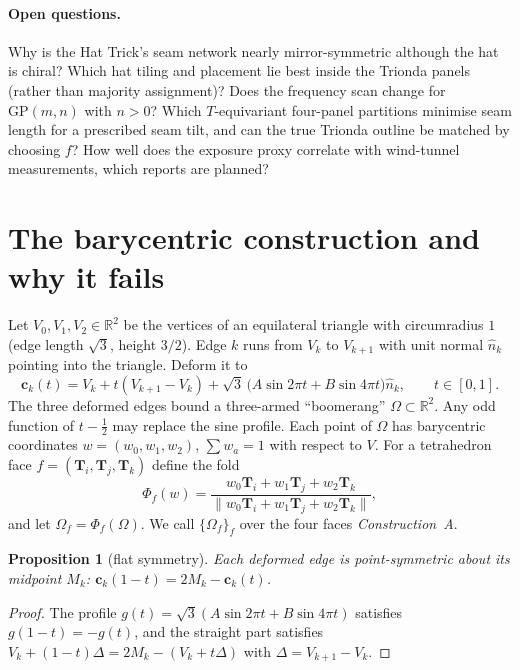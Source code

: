 \documentclass[11pt]{article}
\newtheorem{proposition}[theorem]{Proposition}
\theoremstyle{definition}
\theoremstyle{remark}
\newcommand{\R}{\mathbb{R}}
\begin{document}
\paragraph{Open questions.}
Why is the Hat Trick's seam network nearly mirror-symmetric although the hat is chiral? Which hat tiling and placement lie best inside the Trionda panels (rather than majority assignment)? Does the frequency scan change for $\mathrm{GP}(m,n)$ with $n>0$? Which $T$-equivariant four-panel partitions minimise seam length for a prescribed seam tilt, and can the true Trionda outline be matched by choosing $f$? How well does the exposure proxy correlate with wind-tunnel
measurements, which \citet{hasson_sciam} reports are planned?

\appendix
\section{The barycentric construction and why it fails}\label{sec:A}
Let $V_0,V_1,V_2\in\R^2$ be the vertices of an equilateral triangle with circumradius $1$ (edge length $\sqrt3$,
height $3/2$). Edge $k$ runs from $V_k$ to $V_{k+1}$ with unit normal $\hat n_k$ pointing into the triangle. Deform it to
\begin{equation}\label{eq:chiral-edge}
 \mathbf c_k(t)=V_k+t(V_{k+1}-V_k)+\sqrt3\,\bigl(A\sin2\pi t+B\sin4\pi t\bigr)\hat n_k,\qquad t\in[0,1].
\end{equation}
The three deformed edges bound a three-armed ``boomerang'' $\Omega\subset\R^2$. Any odd function of $t-\tfrac12$ may replace the sine
profile. Each point of $\Omega$ has barycentric coordinates $w=(w_0,w_1,w_2)$, $\sum w_a=1$ with respect to $V$. For a
tetrahedron face $f=(\mathbf T_{i},\mathbf T_{j},\mathbf T_{k})$ define the fold
\begin{equation}\label{eq:fold}
 \Phi_f(w)=\frac{w_0\mathbf T_i+w_1\mathbf T_j+w_2\mathbf T_k}{\lVert w_0\mathbf T_i+w_1\mathbf T_j+w_2\mathbf T_k\rVert},
\end{equation}
and let $\Omega_f=\Phi_f(\Omega)$. We call $\{\Omega_f\}_f$ over the four faces \emph{Construction~A}.

\begin{proposition}[flat symmetry]\label{prop:flat}
Each deformed edge is point-symmetric about its midpoint $M_k$: $\mathbf c_k(1-t)=2M_k-\mathbf c_k(t)$.
\end{proposition}
\begin{proof}
The profile $g(t)=\sqrt3(A\sin2\pi t+B\sin4\pi t)$ satisfies $g(1-t)=-g(t)$, and the straight part satisfies
$V_k+(1-t)\Delta=2M_k-(V_k+t\Delta)$ with $\Delta=V_{k+1}-V_k$.
\end{proof}
\end{document}
